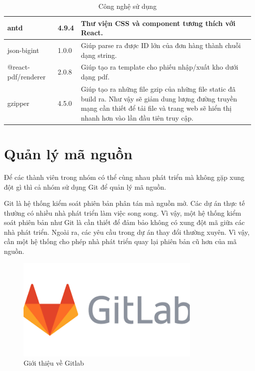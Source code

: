 \begin{table}[!htp]
\begin{tabular}{|l|l|m{20em}|}
			\hline
			antd & 4.9.4 &Thư viện CSS và component tương thích với React. \\
			\hline
			json-bigint & 1.0.0 &  Giúp parse ra được ID lớn của đơn hàng thành chuỗi dạng string. \\
			\hline
			@react-pdf/renderer & 2.0.8 & Giúp tạo ra template cho phiếu nhập/xuất kho dưới dạng pdf. \\
			\hline
			gzipper & 4.5.0 & Giúp tạo ra những file gzip của những file static đã build ra. Như vậy sẽ giảm dung lượng đường truyền mạng cần thiết để tải file và trang web sẽ hiển thị nhanh hơn vào lần đầu tiên truy cập. \\
			\hline
		\end{tabular}
		\caption{Công nghệ sử dụng}
	\end{table}


 


\section{Quản lý mã nguồn}
	
	Để các thành viên trong nhóm có thể cùng nhau phát triển mà không gặp xung đột gì thì cả nhóm sử dụng Git để quản lý mã nguồn. 
	
	Git là hệ thống kiểm soát phiên bản phân tán mà nguồn mở. Các dự án thực tế thường có nhiều nhà phát triển làm việc song song. Vì vậy, một hệ thống kiểm soát phiên bản như Git là cần thiết để đảm bảo không có xung đột mã giữa các nhà phát triển. Ngoài ra, các yêu cầu trong dự án thay đổi thường xuyên. Vì vậy, cần một hệ thống cho phép nhà phát triển quay lại phiên bản cũ hơn của mã nguồn.
	
	\begin{figure}[!ht]
		\includegraphics[width=0.8\textwidth]{Images/gitlab.png}
		\centering
		\linebreak
		\caption{Giới thiệu về Gitlab}
	\end{figure}
	
